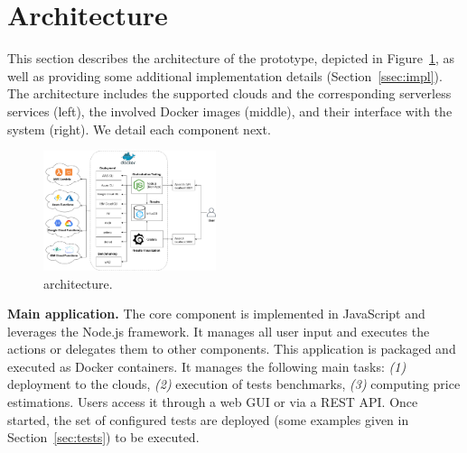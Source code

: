 \section{Architecture}\label{sec:architecture}
This section describes the architecture of the \sys prototype, depicted in Figure~\ref{fig:architecture}, as well as providing some additional implementation details (Section~\ref{ssec:impl}).
The architecture includes the supported clouds and the corresponding serverless services (left), the involved Docker images (middle), and their interface with the system (right).
We detail each component next. 

\begin{figure}[!t]
\begin{center}
\includegraphics[width=0.45\textwidth]{bilder/main_app.png}
\caption{\sys architecture.}
\label{fig:architecture}
\end{center}
\end{figure}



\textbf{Main application.} The \sys core component is implemented in JavaScript and leverages the Node.js framework. 
It manages all user input and executes the actions or delegates them to other components. 
This application is packaged and executed as Docker containers. 
It manages the following main tasks: \emph{(1)} deployment to the clouds, \emph{(2)} execution of tests benchmarks, \emph{(3)} computing price estimations. 
Users access it through a web \gls{GUI} or via a REST \gls{API}. 
Once started, the set of configured tests are deployed (some examples given in Section~\ref{sec:tests}) to be executed.

